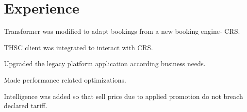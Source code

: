 \documentclass[]{deedy-resume-openfont}
\begin{document}
%
%


%
%



\begin{center}
\huge\color{subheadings}
\end{center}

\section{Experience}
\runsubsection{}
\vspace{\topsep} %

\begin{tightemize}
\item Transformer was modified to adapt bookings from a new booking engine- CRS.
\item THSC client was integrated to interact with CRS. 
\end{tightemize}

\begin{tightemize}
\item Upgraded the legacy platform application according business needs.
\item Made performance related optimizations.
\item Intelligence was added so that sell price due to applied promotion do not breach declared tariff.
\end{tightemize}
\end{document}
